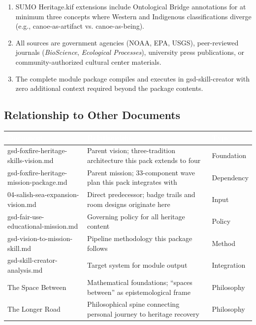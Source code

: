 \documentclass[11pt,letterpaper]{article}
\newcommand{\tableheader}[1]{\textbf{\sffamily\textcolor{white}{#1}}}
\begin{document}
\begin{enumerate}[leftmargin=2em]
\item SUMO Heritage.kif extensions include Ontological Bridge annotations for at minimum three concepts where Western and Indigenous classifications diverge (e.g., canoe-as-artifact vs. canoe-as-being).

\item All sources are government agencies (NOAA, EPA, USGS), peer-reviewed journals (\textit{BioScience}, \textit{Ecological Processes}), university press publications, or community-authorized cultural center materials.

\item The complete module package compiles and executes in gsd-skill-creator with zero additional context required beyond the package contents.
\end{enumerate}

\subsection{Relationship to Other Documents}

\begin{center}
\begin{tabularx}{\textwidth}{L{4.5cm}XC{2cm}}
\toprule
{}
\tableheader{Document} & \tableheader{Relationship} & \tableheader{Type} \\
\midrule
gsd-foxfire-heritage-skills-vision.md & Parent vision; three-tradition architecture this pack extends to four & Foundation \\
gsd-foxfire-heritage-mission-package.md & Parent mission; 33-component wave plan this pack integrates with & Dependency \\
04-salish-sea-expansion-vision.md & Direct predecessor; badge trails and room designs originate here & Input \\
gsd-fair-use-educational-mission.md & Governing policy for all heritage content & Policy \\
gsd-vision-to-mission-skill.md & Pipeline methodology this package follows & Method \\
gsd-skill-creator-analysis.md & Target system for module output & Integration \\
The Space Between & Mathematical foundations; ``spaces between'' as epistemological frame & Philosophy \\
The Longer Road & Philosophical spine connecting personal journey to heritage recovery & Philosophy \\
\bottomrule
\end{tabularx}
\end{center}
\end{document}

